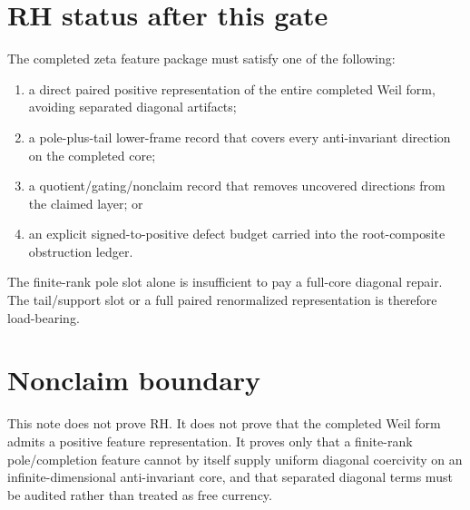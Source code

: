 \documentclass[11pt]{article}
\begin{document}
\section{RH status after this gate}
The completed zeta feature package must satisfy one of the following:
\begin{enumerate}[label=(\alph*)]
\item a direct paired positive representation of the entire completed Weil form, avoiding separated diagonal artifacts;
\item a pole-plus-tail lower-frame record that covers every anti-invariant direction on the completed core;
\item a quotient/gating/nonclaim record that removes uncovered directions from the claimed layer; or
\item an explicit signed-to-positive defect budget carried into the root-composite obstruction ledger.
\end{enumerate}
The finite-rank pole slot alone is insufficient to pay a full-core diagonal repair.  The tail/support slot or a full paired renormalized representation is therefore load-bearing.

\section{Nonclaim boundary}
This note does not prove RH.  It does not prove that the completed Weil form admits a positive feature representation.  It proves only that a finite-rank pole/completion feature cannot by itself supply uniform diagonal coercivity on an infinite-dimensional anti-invariant core, and that separated diagonal terms must be audited rather than treated as free currency.
\end{document}
